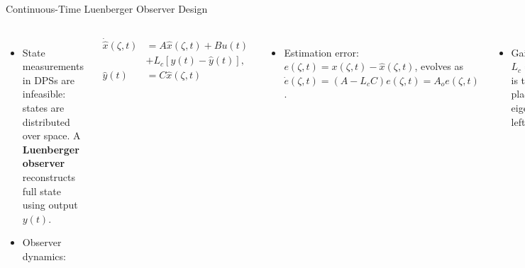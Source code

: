 \documentclass[8pt]{beamer}
\begin{document}
\begin{frame}{Continuous-Time Luenberger Observer Design}
\begin{columns}[t]
\begin{itemize}
    \item State measurements in DPSs are infeasible: states are distributed over space. A \textbf{Luenberger observer} reconstructs full state using output \( y(t) \).
    \item Observer dynamics:
\end{itemize}
\begin{small}
\begin{equation}
    \begin{aligned}
    \dot{\hat{x}}(\zeta, t) &= A \hat{x}(\zeta, t) + B u(t)\\
    &+ {L}_c \left[y(t) - \hat{y}(t)\right], \\[1mm]
    \hat{y}(t) &= C \hat{x}(\zeta, t)
    \end{aligned}
\end{equation}
\end{small}
\begin{itemize}
    \item Estimation error: \( e(\zeta, t) = x(\zeta, t) - \hat{x}(\zeta, t) \), evolves as \( \dot{e}(\zeta, t) = (A - {L}_c C) e(\zeta, t) = A_o  e(\zeta, t) \).
\end{itemize}
\begin{itemize}
    \item Gain \( {L}_c = f(\zeta, l_{\text{obs}}) \) is tuned to place $A_o$ eigenvalues in left half-plane.
\end{itemize}
\begin{figure}
    \centering
    
    \caption{The effect of various observer gains ${L}_c = f(\zeta, l_{obs})$ on the eigenvalues of state reconstruction error dynamics $\lambda_o$.}
\end{figure}
\end{columns}
\end{frame}
\end{document}
